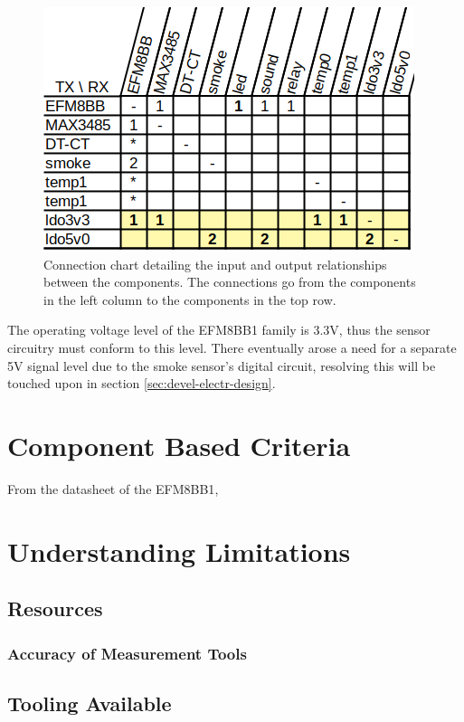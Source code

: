 \documentclass[12pt]{article}
\begin{document}
  \begin{figure}[]
    \centering
    \caption{Connection chart detailing the input and output relationships between the components. The connections go from the components in the left column to the components in the top row.}
    \label{fig:connect-diag}
    \includegraphics{connection-chart}
  \end{figure}
	
  The operating voltage level of the EFM8BB1 family is 3.3V, thus the sensor circuitry must conform to this level. There eventually arose a need for a separate 5V signal level due to the smoke sensor's digital circuit, resolving this will be touched upon in section \ref{sec:devel-electr-design}.

  \section{Component Based Criteria}

  From the datasheet of the EFM8BB1\cite{silabs:efm8bb1}, 

	\section{Understanding Limitations}
	\subsection{Resources}
  \subsubsection{Accuracy of Measurement Tools}
	\subsection{Tooling Available}
	
\end{document}

